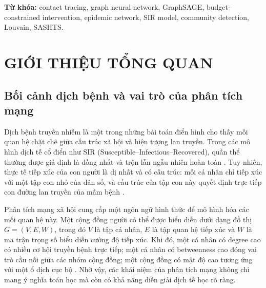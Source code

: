 \documentclass[12pt,a4paper]{report}
\theoremstyle{definition}
\begin{document}
\vspace{6pt}
\noindent\textbf{Từ khóa:} contact tracing, graph neural network, GraphSAGE, budget-constrained intervention, epidemic network, SIR model, community detection, Louvain, SASHTS.

\listoftables
{}
\listoffigures
{}
\tableofcontents

\clearpage
{}
\setcounter{page}{1}

\chapter{GIỚI THIỆU TỔNG QUAN}

\section{Bối cảnh dịch bệnh và vai trò của phân tích mạng}

Dịch bệnh truyền nhiễm là một trong những bài toán điển hình cho thấy mối quan hệ chặt chẽ giữa cấu trúc xã hội và hiện tượng lan truyền. Trong các mô hình dịch tễ cổ điển như SIR (Susceptible--Infectious--Recovered), quần thể thường được giả định là đồng nhất và trộn lẫn ngẫu nhiên hoàn toàn \cite{kermack1927, keeling2005}. Tuy nhiên, thực tế tiếp xúc của con người là dị nhất và có cấu trúc: mỗi cá nhân chỉ tiếp xúc với một tập con nhỏ của dân số, và cấu trúc của tập con này quyết định trực tiếp con đường lan truyền của mầm bệnh \cite{watts1998, barabasi1999, pastorSatorras2001}.

Phân tích mạng xã hội cung cấp một ngôn ngữ hình thức để mô hình hóa các mối quan hệ này. Một cộng đồng người có thể được biểu diễn dưới dạng đồ thị $G=(V,E,W)$, trong đó $V$ là tập cá nhân, $E$ là tập quan hệ tiếp xúc và $W$ là ma trận trọng số biểu diễn cường độ tiếp xúc. Khi đó, một cá nhân có degree cao có nhiều cơ hội truyền bệnh trực tiếp; một cá nhân có betweenness cao đóng vai trò cầu nối giữa các nhóm cộng đồng; một cộng đồng có mật độ cao tương ứng với một ổ dịch cục bộ \cite{freeman1977, newman2006}. Nhờ vậy, các khái niệm của phân tích mạng không chỉ mang ý nghĩa toán học mà còn có khả năng diễn giải dịch tễ học rõ ràng.
\end{document}
